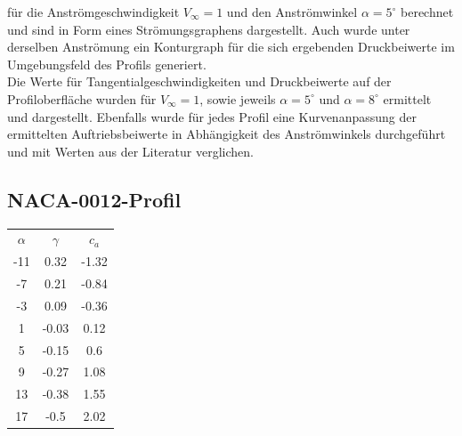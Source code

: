 für die Anströmgeschwindigkeit $V_{\infty} = 1$ und den Anströmwinkel $\alpha =5^{\circ}$ berechnet und sind in Form eines Strömungsgraphens dargestellt. Auch wurde unter derselben Anströmung ein Konturgraph für die sich ergebenden Druckbeiwerte im Umgebungsfeld des Profils generiert. \\
Die Werte für Tangentialgeschwindigkeiten und Druckbeiwerte auf der Profiloberfläche wurden für $V_{\infty} = 1$, sowie jeweils $\alpha =5^{\circ}$ und $\alpha =8^{\circ}$ ermittelt und dargestellt. Ebenfalls wurde für jedes Profil eine Kurvenanpassung der ermittelten Auftriebsbeiwerte in Abhängigkeit des Anströmwinkels durchgeführt und mit Werten aus der Literatur verglichen.

\newpage
\subsection{NACA-0012-Profil} 
\begin{minipage}{0.45\textwidth}
\begin{table}[H]
    \centering
    \begin{tabular}{c|cc}
    $\alpha$ & $\gamma$ & $c_a$ \\
        -11 & 0.32 & -1.32 \\ 
-7 & 0.21 & -0.84 \\ 
-3 & 0.09 & -0.36 \\ 
1 & -0.03 & 0.12 \\ 
5 & -0.15 & 0.6 \\ 
9 & -0.27 & 1.08 \\ 
13 & -0.38 & 1.55 \\ 
17 & -0.5 & 2.02 \\ 

    \end{tabular}
    \label{tab:naca}
\end{table}
\end{minipage}
\hfill
